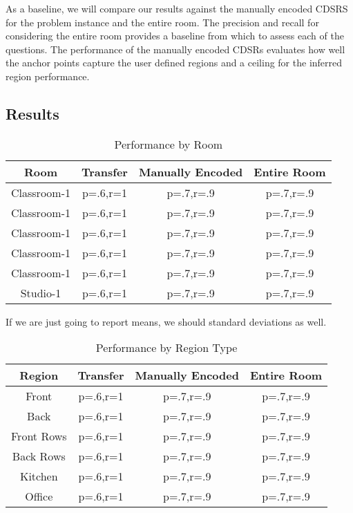As a baseline, we will compare our results against the manually encoded CDSRS for the problem instance and the entire room. The precision and recall for considering the entire room provides a baseline from which to assess each of the questions. The performance of the manually encoded CDSRs evaluates how well the anchor points capture the user defined regions and a ceiling for the inferred region performance.

\subsection{Results}
\begin{table}
\caption{Performance by Room}
\begin{tabular}{|c|c|c|c|}
\hline
Room & Transfer & Manually Encoded & Entire Room \\
\hline
Classroom-1 & p=.6,r=1 & p=.7,r=.9 & p=.7,r=.9 \\
Classroom-1 & p=.6,r=1 & p=.7,r=.9 & p=.7,r=.9 \\
Classroom-1 & p=.6,r=1 & p=.7,r=.9 & p=.7,r=.9 \\
Classroom-1 & p=.6,r=1 & p=.7,r=.9 & p=.7,r=.9 \\
Classroom-1 & p=.6,r=1 & p=.7,r=.9 & p=.7,r=.9 \\
Studio-1 & p=.6,r=1 & p=.7,r=.9 & p=.7,r=.9 \\
\hline
\end{tabular}
\end{table}

If we are just going to report means, we should standard deviations as well.

\begin{table}
\caption{Performance by Region Type}
\begin{tabular}{|c|c|c|c|}
\hline
Region & Transfer & Manually Encoded & Entire Room \\
\hline
Front & p=.6,r=1 & p=.7,r=.9 & p=.7,r=.9 \\
Back & p=.6,r=1 & p=.7,r=.9 & p=.7,r=.9 \\
Front Rows & p=.6,r=1 & p=.7,r=.9 & p=.7,r=.9 \\
Back Rows & p=.6,r=1 & p=.7,r=.9 & p=.7,r=.9 \\
Kitchen & p=.6,r=1 & p=.7,r=.9 & p=.7,r=.9 \\
Office & p=.6,r=1 & p=.7,r=.9 & p=.7,r=.9 \\
\hline
\end{tabular}
\end{table}

